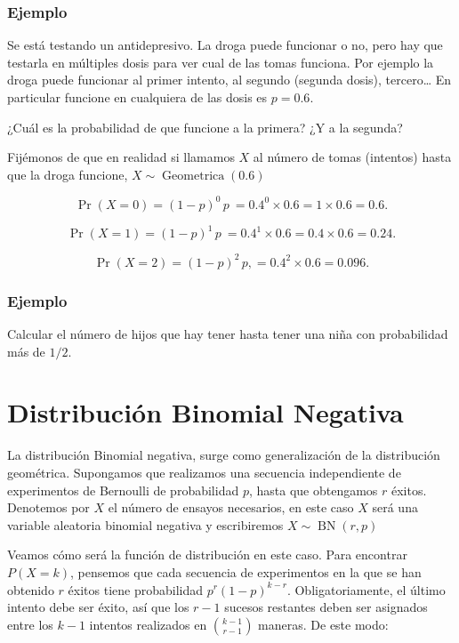\documentclass[]{book}
\theoremstyle{plain}
\theoremstyle{definition}
\theoremstyle{definition} %
\begin{document}
\hypertarget{ejemplo-2}{%
\subsubsection{Ejemplo}\label{ejemplo-2}}

Se está testando un antidepresivo. La droga puede funcionar o no, pero
hay que testarla en múltiples dosis para ver cual de las tomas funciona.
Por ejemplo la droga puede funcionar al primer intento, al segundo
(segunda dosis), tercero\ldots{} En particular funcione en cualquiera de
las dosis es \(p=0.6\).

¿Cuál es la probabilidad de que funcione a la primera? ¿Y a la segunda?

Fijémonos de que en realidad si llamamos \(X\) al número de tomas
(intentos) hasta que la droga funcione,
\(\displaystyle X\sim \operatorname {Geometrica} (0.6)\)

\[\displaystyle \Pr(X=0)=(1-p)^{0}\,p\ =0.4^{0}\times 0.6=1\times 0.6=0.6.\]

\[\displaystyle \Pr(X=1)=(1-p)^{1}\,p\ =0.4^{1}\times 0.6=0.4\times 0.6=0.24.\]

\[\displaystyle \Pr(X=2)=(1-p)^{2}\,p,=0.4^{2}\times 0.6=0.096.\]

\hypertarget{ejemplo-3}{%
\subsubsection{Ejemplo}\label{ejemplo-3}}

Calcular el número de hijos que hay tener hasta tener una niña con
probabilidad más de \(1/2\).

\hypertarget{distribuciuxf3n-binomial-negativa}{%
\section{Distribución Binomial
Negativa}\label{distribuciuxf3n-binomial-negativa}}

La distribución Binomial negativa, surge como generalización de la
distribución geométrica. Supongamos que realizamos una secuencia
independiente de experimentos de Bernoulli de probabilidad \(p\), hasta
que obtengamos \(r\) éxitos. Denotemos por \(X\) el número de ensayos
necesarios, en este caso \(X\) será una variable aleatoria binomial
negativa y escribiremos \(\displaystyle X\sim \operatorname {BN} (r,p)\)

Veamos cómo será la función de distribución en este caso. Para encontrar
\(P(X=k)\), pensemos que cada secuencia de experimentos en la que se han
obtenido \(r\) éxitos tiene probabilidad \(p^r(1-p)^{k-r}\).
Obligatoriamente, el último intento debe ser éxito, así que los \(r-1\)
sucesos restantes deben ser asignados entre los \(k-1\) intentos
realizados en \({k-1 \choose r-1}\) maneras. De este modo:
\end{document}
